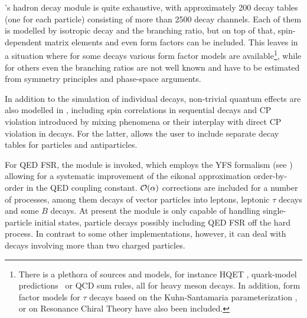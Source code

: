 \Sherpa's hadron decay module is quite exhaustive, with approximately 
200 decay tables (one for each particle) consisting of more than 2500 
decay channels. Each of them is modelled by isotropic decay
and the branching ratio, but on top of that, spin-dependent
matrix elements and even form factors can be included.  This leaves \Sherpa
in a situation where for some decays various form factor models
are available\footnote{There is a plethora of sources and models, 
  for instance HQET \cite{Neubert:1993mb,Caprini:1997mu,Richman:1995wm}, 
  quark-model predictions~\cite{Isgur:1988gb,Scora:1995ty,Goity:1994xn} or
  QCD sum rules\cite{Ball:2004ye,Ball:2004rg,Ball:2007hb,Aliev:2007uu},
  all for heavy meson decays.  In addition, form factor models for $\tau$
  decays based on the Kuhn-Santamaria parameterization \cite{Kuhn:1990ad},
  or on Resonance Chiral Theory 
  \cite{Weinberg:1978kz,Gasser:1983yg,Gasser:1984gg,Ecker:1988te}
  have also been included.}, 
while for others even the branching ratios are not well known and have to be 
estimated from symmetry principles and phase-space arguments.  

In addition to the simulation of individual decays, non-trivial quantum 
effects are also modelled in \Sherpa, including spin correlations in 
sequential decays and CP violation introduced by mixing phenomena or their 
interplay with direct CP violation in decays.  For the latter, \Sherpa allows 
the user to include separate decay tables for particles and antiparticles.  

For QED FSR, the \Photons module \cite{Schonherr:2008av} is invoked, 
which employs the YFS formalism (see  )
allowing for a systematic improvement of the 
eikonal approximation order-by-order in the QED coupling constant. 
${\cal O}(\alpha)$ corrections are
included for a number of processes, among them decays of vector particles
into leptons, leptonic $\tau$ decays and some $B$ decays.  
At present the module is only capable of handling single-particle initial 
states, \ie particle decays possibly including QED FSR off the hard 
process.  In contrast to some other implementations, however, it can deal with
decays involving more than two charged particles.  

\label{Sec:interfaces_extensions_sherpa}
